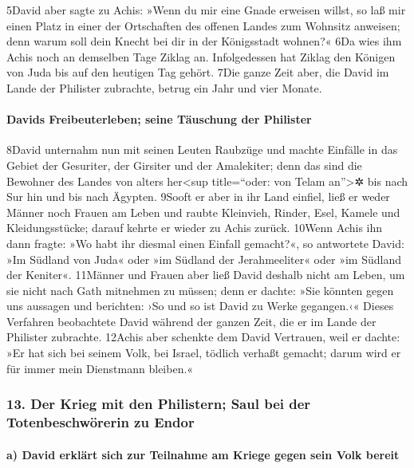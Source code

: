 5David aber sagte zu Achis: »Wenn du mir eine Gnade erweisen willst, so
laß mir einen Platz in einer der Ortschaften des offenen Landes zum
Wohnsitz anweisen; denn warum soll dein Knecht bei dir in der
Königsstadt wohnen?« 6Da wies ihm Achis noch an demselben Tage Ziklag
an. Infolgedessen hat Ziklag den Königen von Juda bis auf den heutigen
Tag gehört. 7Die ganze Zeit aber, die David im Lande der Philister
zubrachte, betrug ein Jahr und vier Monate.

\hypertarget{davids-freibeuterleben-seine-tuxe4uschung-der-philister}{%
\paragraph{Davids Freibeuterleben; seine Täuschung der
Philister}\label{davids-freibeuterleben-seine-tuxe4uschung-der-philister}}

8David unternahm nun mit seinen Leuten Raubzüge und machte Einfälle in
das Gebiet der Gesuriter, der Girsiter und der Amalekiter; denn das sind
die Bewohner des Landes von alters her\textless sup title=``oder: von
Telam an''\textgreater✲ bis nach Sur hin und bis nach Ägypten. 9Sooft er
aber in ihr Land einfiel, ließ er weder Männer noch Frauen am Leben und
raubte Kleinvieh, Rinder, Esel, Kamele und Kleidungsstücke; darauf
kehrte er wieder zu Achis zurück. 10Wenn Achis ihn dann fragte: »Wo habt
ihr diesmal einen Einfall gemacht?«, so antwortete David: »Im Südland
von Juda« oder »im Südland der Jerahmeeliter« oder »im Südland der
Keniter«. 11Männer und Frauen aber ließ David deshalb nicht am Leben, um
sie nicht nach Gath mitnehmen zu müssen; denn er dachte: »Sie könnten
gegen uns aussagen und berichten: ›So und so ist David zu Werke
gegangen.‹« Dieses Verfahren beobachtete David während der ganzen Zeit,
die er im Lande der Philister zubrachte. 12Achis aber schenkte dem David
Vertrauen, weil er dachte: »Er hat sich bei seinem Volk, bei Israel,
tödlich verhaßt gemacht; darum wird er für immer mein Dienstmann
bleiben.«

\hypertarget{der-krieg-mit-den-philistern-saul-bei-der-totenbeschwuxf6rerin-zu-endor}{%
\subsubsection{13. Der Krieg mit den Philistern; Saul bei der
Totenbeschwörerin zu
Endor}\label{der-krieg-mit-den-philistern-saul-bei-der-totenbeschwuxf6rerin-zu-endor}}

\hypertarget{a-david-erkluxe4rt-sich-zur-teilnahme-am-kriege-gegen-sein-volk-bereit}{%
\paragraph{a) David erklärt sich zur Teilnahme am Kriege gegen sein Volk
bereit}\label{a-david-erkluxe4rt-sich-zur-teilnahme-am-kriege-gegen-sein-volk-bereit}}

